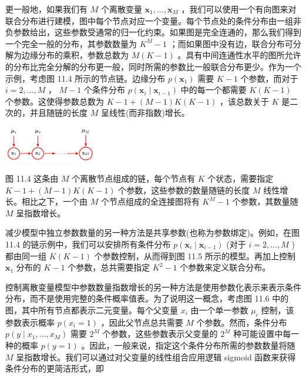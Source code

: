 \documentclass[10pt]{report}
\begin{document}
更一般地，如果我们有 \(M\) 个离散变量 \({\mathbf{x}}_{1},\ldots ,{\mathbf{x}}_{M}\) ，我们可以使用一个有向图来对联合分布进行建模，图中每个节点对应一个变量。每个节点处的条件分布由一组非负参数给出，这些参数受通常的归一化约束。如果图是完全连通的，那么我们得到一个完全一般的分布，其参数数量为 \({K}^{M} - 1\) ；而如果图中没有边，联合分布可分解为边缘分布的乘积，参数总数为 \(M\left( {K - 1}\right)\) 。具有中间连通性水平的图所允许的分布比完全分解的分布更一般，同时所需的参数比一般联合分布更少。作为一个示例，考虑图 11.4 所示的节点链。边缘分布 \(p\left( {\mathbf{x}}_{1}\right)\) 需要 \(K - 1\) 个参数，而对于 \(i = 2,\ldots ,M\) ， \(M - 1\) 个条件分布 \(p\left( {{\mathbf{x}}_{i} \mid  {\mathbf{x}}_{i - 1}}\right)\) 中的每一个都需要 \(K\left( {K - 1}\right)\) 个参数。这使得参数总数为 \(K - 1 + \left( {M - 1}\right) K\left( {K - 1}\right)\) ，该总数关于 \(K\) 是二次的，并且随链的长度 \(M\) 呈线性(而非指数)增长。

\begin{center}
\includegraphics[max width=0.3\textwidth]{images/0194e279-9b28-703a-88f4-c3ac21e2010d_350_1073_354_480_189_0.jpg}
\end{center}
\hspace*{3em} 

图 11.4 这条由 \(M\) 个离散节点组成的链，每个节点有 \(K\) 个状态，需要指定 \(K - 1 + \left( {M - 1}\right) K\left( {K - 1}\right)\) 个参数，这些参数的数量随链的长度 \(M\) 线性增长。相比之下，一个由 \(M\) 个节点组成的全连接图将有 \({K}^{M} - 1\) 个参数，其数量随 \(M\) 呈指数增长。

减少模型中独立参数数量的另一种方法是共享参数(也称为参数绑定)。例如，在图 11.4 的链示例中，我们可以安排所有条件分布 \(p\left( {{\mathbf{x}}_{i} \mid  {\mathbf{x}}_{i - 1}}\right)\) (对于 \(i = 2,\ldots ,M\) )都由同一组 \(K\left( {K - 1}\right)\) 个参数控制，从而得到图 11.5 所示的模型。再加上控制 \({\mathbf{x}}_{1}\) 分布的 \(K - 1\) 个参数，总共需要指定 \({K}^{2} - 1\) 个参数来定义联合分布。

控制离散变量模型中参数数量指数增长的另一种方法是使用参数化表示来表示条件分布，而不是使用完整的条件概率值表。为了说明这一概念，考虑图 11.6 中的图，其中所有节点都表示二元变量。每个父变量 \({x}_{i}\) 由一个单一参数 \({\mu }_{i}\) 控制，该参数表示概率 \(p\left( {{x}_{i} = 1}\right)\) ，因此父节点总共需要 \(M\) 个参数。然而，条件分布 \(p\left( {y \mid  {x}_{1},\ldots ,{x}_{M}}\right)\) 需要 \({2}^{M}\) 个参数，这些参数表示父变量的 \({2}^{M}\) 种可能设置中每一种的概率 \(p\left( {y = 1}\right)\) 。因此，一般来说，指定这个条件分布所需的参数数量将随 \(M\) 呈指数增长。我们可以通过对父变量的线性组合应用逻辑 sigmoid 函数来获得条件分布的更简洁形式，即
\end{document}
